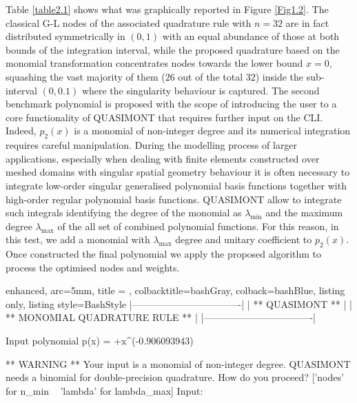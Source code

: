 \documentclass[a4paper, twosided]{book}
\begin{document}
\noindent
Table \ref{table2.1} shows what was graphically reported in Figure \ref{Fig1.2}. The classical G-L nodes of the associated quadrature rule with $n=32$ are in fact distributed symmetrically in $(0,1)$ with an equal abundance of those at both bounds of the integration interval, while the proposed quadrature based on the monomial transformation  concentrates nodes towards the lower bound $x=0$, squashing the vast majority of them ($26$ out of the total $32$) inside the sub-interval $(0,0.1)$ where the singularity behaviour is captured. The second benchmark polynomial is proposed with the scope of introducing the user to a core functionality of QUASIMONT that requires further input on the CLI. Indeed, $p_2(x)$ is a monomial of non-integer degree and its numerical integration requires careful manipulation. During the modelling process of larger applications, especially when dealing with finite elements constructed over meshed domains with singular spatial geometry behaviour \cite{Graglia04,Graglia08} it is often necessary to integrate low-order singular generalised polynomial basis functions together with high-order regular polynomial basis functions. QUASIMONT allow to integrate such integrals identifying the degree of the monomial as $\lambda_{\text{min}}$ and the maximum degree  $\lambda_{\text{max}}$ of the all set of combined polynomial functions. For this reason, in this test, we add a monomial with $\lambda_{\text{max}}$ degree and unitary coefficient to $p_2(x)$. Once constructed the final polynomial we apply the proposed algorithm to process the optimised nodes and weights. 

\vspace{0.15cm}
\begin{tcblisting}{enhanced,
                   arc=5mm,
                   title = \color{black}{\large \ttfamily Building and executing the test driver: p\_2(x)},
                   colbacktitle=bashGray,
                   colback=bashBlue,
                   listing only,
                   listing style=BashStyle}
    |----------------------------------|
    |          ** QUASIMONT **         |
    |  ** MONOMIAL QUADRATURE RULE **  |
    |----------------------------------|

 Input polynomial p(x) =  +x^(-0.906093943) 

 ** WARNING ** Your input is a monomial of non-integer degree.
               QUASIMONT needs a binomial for double-precision quadrature.
               How do you proceed? ['nodes' for n_min ~ 'lambda' for lambda_max]
               Input: 
\end{tcblisting}
\end{document}
